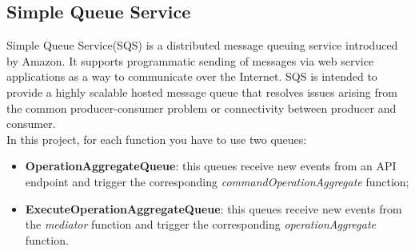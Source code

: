 \subsection{Simple Queue Service}
Simple Queue Service(SQS) is a distributed message queuing service introduced by Amazon. It supports programmatic sending of messages via web service applications as a way to communicate over the Internet. SQS is intended to provide a highly scalable hosted message queue that resolves issues arising from the common producer-consumer problem or connectivity between producer and consumer.\\

In this project, for each function you have to use two queues: 
\begin{itemize}
	\item \textbf{OperationAggregateQueue}: this queues receive new events from an API endpoint and trigger the corresponding \emph{commandOperationAggregate} function;
	\item \textbf{ExecuteOperationAggregateQueue}: this queues receive new events from the \emph{mediator} function and trigger the corresponding \emph{operationAggregate} function.
\end{itemize}
